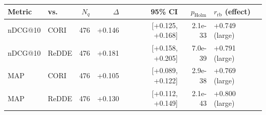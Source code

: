\begin{tabular}{llrrrrl}
\toprule
Metric & vs.\ & $N_q$ & $\Delta$ & 95\% CI & $p_{\text{Holm}}$ & $r_{\mathrm{rb}}$ (effect) \\
\midrule
nDCG@10 & CORI & 476 & +0.146 & [+0.125, +0.168] & 2.1e-33 & +0.749 (large) \\
nDCG@10 & ReDDE & 476 & +0.181 & [+0.158, +0.205] & 7.0e-39 & +0.791 (large) \\
MAP & CORI & 476 & +0.105 & [+0.089, +0.122] & 2.9e-38 & +0.769 (large) \\
MAP & ReDDE & 476 & +0.130 & [+0.112, +0.149] & 2.1e-43 & +0.800 (large) \\
\bottomrule
\end{tabular}
